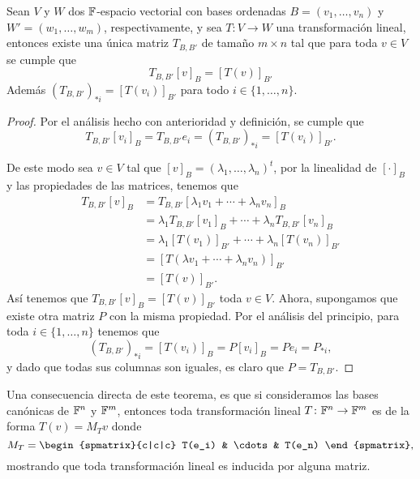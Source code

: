 \begin{teor}
  Sean $V$ y $W$ dos $\mathbb{F}$-espacio vectorial con bases ordenadas $B = (v_1,\ldots,v_n)$ y $W' = (w_1,\ldots,w_m)$, respectivamente, y sea $T\colon V \to W$ una transformación lineal, entonces existe una única matriz $T_{B,B'}$ de tamaño $m\times n$ tal que para toda $v \in V$ se cumple que
    \[ T_{B,B'} [v]_B = [T(v)]_{B'} \]
  Además $(T_{B,B'})_{*i} = [T(v_i)]_{B'}$ para todo $i \in \{1,\ldots,n\}$.
\end{teor}
\begin{proof}
  Por el análisis hecho con anterioridad y definición, se cumple que
  \[ T_{B,B'} [v_i]_B = T_{B,B'} e_i = (T_{B,B'})_{*i} = [T(v_i)]_{B'}. \]
  
  De este modo sea $v \in V$ tal que $[v]_B = (\lambda_1,\ldots,\lambda_n)^t$, por la linealidad de $[\cdot]_B$ y las propiedades de las matrices, tenemos que
  \begin{align*}
    T_{B,B'}[v]_B &= T_{B,B'}[\lambda_1v_1 + \cdots + \lambda_n v_n]_B \\
      &= \lambda_1 T_{B,B'} [v_1]_B + \cdots + \lambda_n T_{B,B'} [v_n]_B \\
      &= \lambda_1 [T(v_1)]_{B'} + \cdots + \lambda_n [T(v_n)]_{B'} \\
      &= [T(\lambda v_1  + \cdots + \lambda_n v_n )]_{B'} \\
      &= [T(v)]_{B'}.
  \end{align*}
  Así tenemos que $T_{B,B'} [v]_B = [T(v)]_{B'}$ toda $v \in V$. Ahora, supongamos que existe otra matriz $P$ con la misma propiedad. Por el análisis del principio, para toda $i \in \{1,\ldots,n\}$ tenemos que
  \[ (T_{B,B'})_{*i} = [T(v_i)]_B = P[v_i]_B = Pe_i = P_{*i}, \]
  y dado que todas sus columnas son iguales, es claro que $P = T_{B,B'}$.
\end{proof}

Una consecuencia directa de este teorema, es que si consideramos las bases canónicas de $\mathbb{F}^n$ y $\mathbb{F}^m$, entonces toda transformación lineal $T\colon \mathbb{F}^n \to \mathbb{F}^m$ es de la forma $T(v) = M_T v$ donde
  \[ M_T = \begin{spmatrix}{c|c|c} T(e_i) & \cdots & T(e_n) \end{spmatrix}, \]
mostrando que toda transformación lineal es inducida por alguna matriz.

